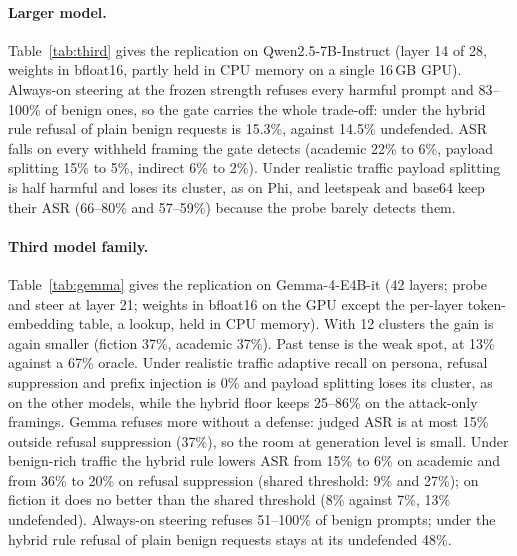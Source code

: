 \documentclass[11pt]{article}
\begin{document}
\paragraph{Larger model.}
Table~\ref{tab:third} gives the replication on Qwen2.5-7B-Instruct (layer 14 of 28, weights in bfloat16, partly held in CPU memory on a single 16\,GB GPU). Always-on steering at the frozen strength refuses every harmful prompt and 83--100\% of benign ones, so the gate carries the whole trade-off: under the hybrid rule refusal of plain benign requests is 15.3\%, against 14.5\% undefended. ASR falls on every withheld framing the gate detects (academic 22\% to 6\%, payload splitting 15\% to 5\%, indirect 6\% to 2\%). Under realistic traffic payload splitting is half harmful and loses its cluster, as on Phi, and leetspeak and base64 keep their ASR (66--80\% and 57--59\%) because the probe barely detects them.

\begin{table}[t]
\centering
\resizebox{\columnwidth}{!}{}
\caption{Replication on Qwen2.5-7B-Instruct with the frozen configuration, benign-rich traffic, 10 windows. Columns as in Table~\ref{tab:second}.}
\label{tab:third}
\end{table}

\paragraph{Third model family.}
Table~\ref{tab:gemma} gives the replication on Gemma-4-E4B-it (42 layers; probe and steer at layer 21; weights in bfloat16 on the GPU except the per-layer token-embedding table, a lookup, held in CPU memory). With 12 clusters the gain is again smaller (fiction 37\%, academic 37\%). Past tense is the weak spot, at 13\% against a 67\% oracle. Under realistic traffic adaptive recall on persona, refusal suppression and prefix injection is 0\% and payload splitting loses its cluster, as on the other models, while the hybrid floor keeps 25--86\% on the attack-only framings. Gemma refuses more without a defense: judged ASR is at most 15\% outside refusal suppression (37\%), so the room at generation level is small. Under benign-rich traffic the hybrid rule lowers ASR from 15\% to 6\% on academic and from 36\% to 20\% on refusal suppression (shared threshold: 9\% and 27\%); on fiction it does no better than the shared threshold (8\% against 7\%, 13\% undefended). Always-on steering refuses 51--100\% of benign prompts; under the hybrid rule refusal of plain benign requests stays at its undefended 48\%.
\end{document}
